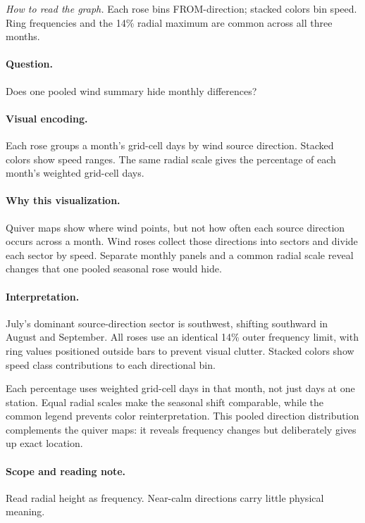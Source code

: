 \documentclass[conference,a4paper]{IEEEtran}
\begin{document}
\noindent\textit{How to read the graph.} Each rose bins FROM-direction; stacked colors bin speed. Ring frequencies and the 14\% radial maximum are common across all three months.

\paragraph{Question.} Does one pooled wind summary hide monthly differences?



\paragraph{Visual encoding.} Each rose groups a month's grid-cell days by wind source direction. Stacked colors show speed ranges. The same radial scale gives the percentage of each month's weighted grid-cell days.



\paragraph{Why this visualization.} Quiver maps show where wind points, but not how often each source direction occurs across a month. Wind roses collect those directions into sectors and divide each sector by speed. Separate monthly panels and a common radial scale reveal changes that one pooled seasonal rose would hide.



\paragraph{Interpretation.} July's dominant source-direction sector is southwest, shifting southward in August and September. All roses use an identical 14\% outer frequency limit, with ring values positioned outside bars to prevent visual clutter. Stacked colors show speed class contributions to each directional bin.

Each percentage uses weighted grid-cell days in that month, not just days at one station. Equal radial scales make the seasonal shift comparable, while the common legend prevents color reinterpretation. This pooled direction distribution complements the quiver maps: it reveals frequency changes but deliberately gives up exact location.



\paragraph{Scope and reading note.} Read radial height as frequency. Near-calm directions carry little physical meaning.
\end{document}
